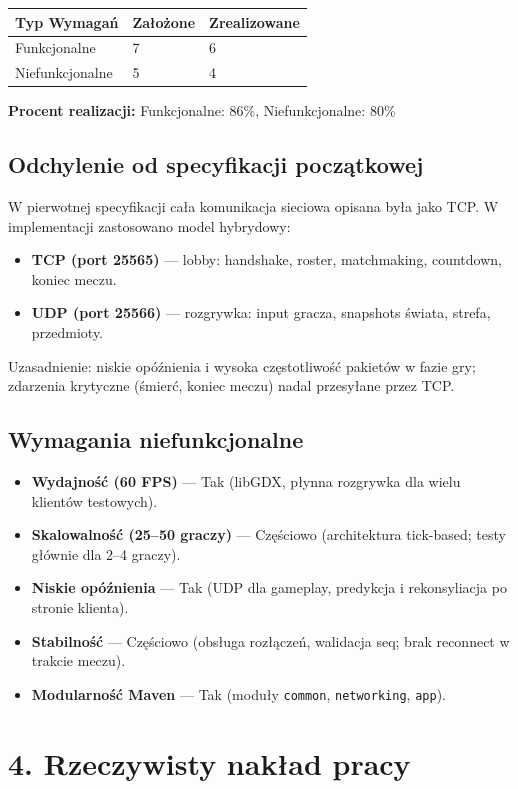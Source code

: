 \documentclass[a4paper,12pt]{article}
\begin{document}
\begin{longtable}{|p{6cm}|p{4cm}|p{4cm}|}
\hline
\textbf{Typ Wymagań} & \textbf{Założone} & \textbf{Zrealizowane} \\
\hline
Funkcjonalne & 7 & 6 \\
\hline
Niefunkcjonalne & 5 & 4 \\
\hline
\end{longtable}

\textbf{Procent realizacji:} Funkcjonalne: 86\%, Niefunkcjonalne: 80\%

\subsection*{Odchylenie od specyfikacji początkowej}
W pierwotnej specyfikacji cała komunikacja sieciowa opisana była jako TCP.
W implementacji zastosowano model hybrydowy:
\begin{itemize}
    \item \textbf{TCP (port 25565)} --- lobby: handshake, roster, matchmaking, countdown, koniec meczu.
    \item \textbf{UDP (port 25566)} --- rozgrywka: input gracza, snapshots świata, strefa, przedmioty.
\end{itemize}
Uzasadnienie: niskie opóźnienia i wysoka częstotliwość pakietów w fazie gry; zdarzenia krytyczne (śmierć, koniec meczu) nadal przesyłane przez TCP.

\subsection*{Wymagania niefunkcjonalne}
\begin{itemize}
    \item \textbf{Wydajność (60 FPS)} --- Tak (libGDX, płynna rozgrywka dla wielu klientów testowych).
    \item \textbf{Skalowalność (25--50 graczy)} --- Częściowo (architektura tick-based; testy głównie dla 2--4 graczy).
    \item \textbf{Niskie opóźnienia} --- Tak (UDP dla gameplay, predykcja i rekonsyliacja po stronie klienta).
    \item \textbf{Stabilność} --- Częściowo (obsługa rozłączeń, walidacja seq; brak reconnect w trakcie meczu).
    \item \textbf{Modularność Maven} --- Tak (moduły \texttt{common}, \texttt{networking}, \texttt{app}).
\end{itemize}

\section*{4. Rzeczywisty nakład pracy}
\end{document}
